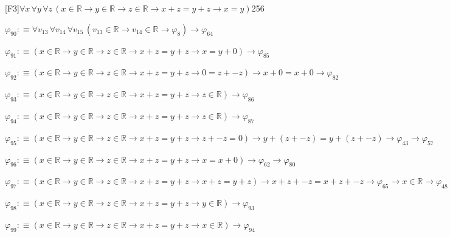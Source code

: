\begin{fullproof}{[F3]}{$\forall x\,\forall y\,\forall z\,(x \in \mathbb{R} \to y \in \mathbb{R} \to z \in \mathbb{R} \to x + z = y + z \to x = y)$}{256}
\begin{abbrevlist}
\item $\varphi_{90} :\equiv \forall v_{13}\,\forall v_{14}\,\forall v_{15}\,(v_{13} \in \mathbb{R} \to v_{14} \in \mathbb{R} \to \varphi_{8}) \to \varphi_{64}$
\item $\varphi_{91} :\equiv (x \in \mathbb{R} \to y \in \mathbb{R} \to z \in \mathbb{R} \to x + z = y + z \to x = y + 0) \to \varphi_{85}$
\item $\varphi_{92} :\equiv (x \in \mathbb{R} \to y \in \mathbb{R} \to z \in \mathbb{R} \to x + z = y + z \to 0 = z + -z) \to x + 0 = x + 0 \to \varphi_{82}$
\item $\varphi_{93} :\equiv (x \in \mathbb{R} \to y \in \mathbb{R} \to z \in \mathbb{R} \to x + z = y + z \to z \in \mathbb{R}) \to \varphi_{86}$
\item $\varphi_{94} :\equiv (x \in \mathbb{R} \to y \in \mathbb{R} \to z \in \mathbb{R} \to x + z = y + z \to z \in \mathbb{R}) \to \varphi_{87}$
\item $\varphi_{95} :\equiv (x \in \mathbb{R} \to y \in \mathbb{R} \to z \in \mathbb{R} \to x + z = y + z \to z + -z = 0) \to y + (z + -z) = y + (z + -z) \to \varphi_{43} \to \varphi_{57}$
\item $\varphi_{96} :\equiv (x \in \mathbb{R} \to y \in \mathbb{R} \to z \in \mathbb{R} \to x + z = y + z \to x = x + 0) \to \varphi_{62} \to \varphi_{80}$
\item $\varphi_{97} :\equiv (x \in \mathbb{R} \to y \in \mathbb{R} \to z \in \mathbb{R} \to x + z = y + z \to x + z = y + z) \to x + z + -z = x + z + -z \to \varphi_{65} \to x \in \mathbb{R} \to \varphi_{48}$
\item $\varphi_{98} :\equiv (x \in \mathbb{R} \to y \in \mathbb{R} \to z \in \mathbb{R} \to x + z = y + z \to y \in \mathbb{R}) \to \varphi_{93}$
\item $\varphi_{99} :\equiv (x \in \mathbb{R} \to y \in \mathbb{R} \to z \in \mathbb{R} \to x + z = y + z \to x \in \mathbb{R}) \to \varphi_{94}$
\end{abbrevlist}
\end{fullproof}
